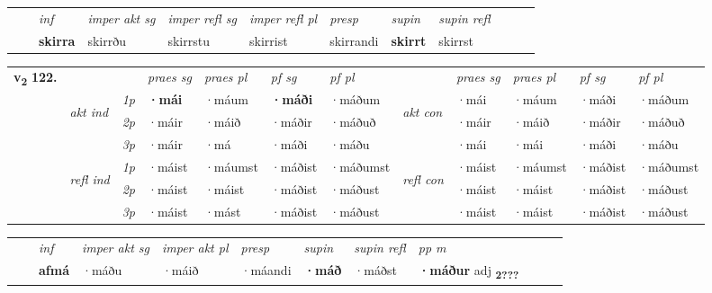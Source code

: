 \begin{tabular}{llllllllllll}
 & & \textit{inf} & \textit{imper akt sg}  & \textit{imper refl sg} & \textit{imper refl pl} & \textit{presp} & \textit{supin} & \textit{supin refl}      \\*
  & & \textbf{skirra} & skirrðu   & skirrstu & skirrist & skirrandi &  \textbf{skirrt} & skirrst  \\*
\cmidrule{1-12}
\end{tabular}



\begin{tabular}{llllllllllll} \toprule
\multirow{4}{*}{{{\textbf{v{\textsubscript{2}}} \Large{\textbf{122.}}}}}  & &   &  \textit{praes sg}  & \textit{praes pl}  &\textit{ pf sg} & \textit{pf pl} &  &  \textit{praes sg}  & \textit{praes pl}  & \textit{pf sg} & \textit{pf pl } \\*
	\cmidrule{4-7} \cmidrule{9-12}
 & \multirow{3}{*}{\begin{turn}{90}\textit{akt ind}\end{turn}} & {\textit{1p}} & \textbf{·mái} & ·máum    & \textbf{·máði} & ·máðum & \multirow{3}{*}{\begin{turn}{90}\textit{akt con}\end{turn}} &·mái & ·máum & ·máði & ·máðum\\*
& &  {\textit{2p}} &  ·máir  & ·máið   & ·máðir & ·máðuð & & ·máir & ·máið & ·máðir & ·máðuð \\*
& &  {\textit{3p}} & ·máir & ·má   & ·máði & ·máðu & & ·mái & ·mái& ·máði & ·máðu  \\*
\cmidrule{4-7} \cmidrule{9-12}
 &\multirow{3}{*}{\begin{turn}{90}\textit{refl ind}\end{turn}} & {\textit{1p}} & ·máist & ·máumst    & ·máðist & ·máðumst & \multirow{3}{*}{\begin{turn}{90}\textit{refl con}\end{turn}}  &·máist & ·máumst & ·máðist & ·máðumst\\*
 &&  {\textit{2p}} &  ·máist  & ·máist   & ·máðist & ·máðust & &·máist & ·máist & ·máðist & ·máðust \\*
& &  {\textit{3p}} & ·máist & ·mást   & ·máðist & ·máðust & & ·máist & ·máist& ·máðist & ·máðust  \\*
\cmidrule{4-7} \cmidrule{9-12}
\end{tabular}


\begin{tabular}{llllllllllll}
 & & \textit{inf} & \textit{imper akt sg} & \textit{imper akt pl}   & \textit{presp} & \textit{supin} & \textit{supin refl} & \textit{pp m}     \\*
  & & \textbf{afmá} & ·máðu  & ·máið   & ·máandi &  \textbf{·máð} & ·máðst & \textbf{·máður} adj \textbf{\textsubscript{2???}} \\*
\cmidrule{1-12}
\end{tabular}



